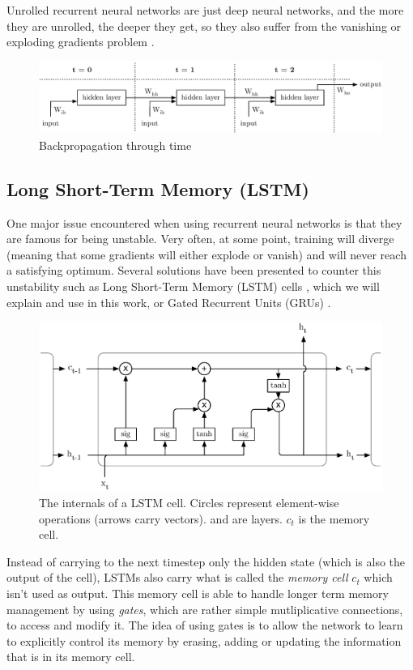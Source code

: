 Unrolled recurrent neural networks are just deep neural networks, and the
more they are unrolled, the deeper they get, so they also suffer from
the vanishing or exploding gradients problem \cite{vanishing_gradient_rnn}.

\begin{figure}
	\centering
	\includegraphics[width=0.8\linewidth]{fig/bptt.eps}
	\caption{Backpropagation through time}
	\label{fig:bptt}
\end{figure}

\subsection{Long Short-Term Memory (LSTM)}
One major issue encountered when using recurrent neural networks is that they
are famous for being unstable. Very often, at some point, training will diverge
(meaning that some gradients will either explode or vanish)
and will never reach a satisfying optimum. Several solutions have been presented
to counter this unstability such as Long Short-Term Memory (LSTM)
cells \cite{lstm}, which we will explain and use in this work, or Gated
Recurrent Units (GRUs) \cite{grus}. \\

\begin{figure}
	\centering
	\includegraphics[width=0.8\linewidth]{fig/lstm.eps}
	\caption{The internals of a LSTM cell. Circles represent element-wise
	operations (arrows carry vectors).  and 
	 are layers. $c_t$ is the memory cell.}
	\label{fig:lstm}
\end{figure}

Instead of carrying to the next timestep only the hidden state (which is also
the output of the cell), LSTMs also carry what is called the
\textit{memory cell} $c_t$ which isn't used as output. This memory cell is 
able to handle longer term memory management by using \textit{gates}, which
are rather simple mutliplicative connections, to 
access and modify it. The idea of using gates is to allow the network
to learn to explicitly control its memory by erasing, adding or updating the
information that is in its memory cell.

